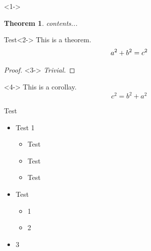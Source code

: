 \documentclass{beamer}
\newtheorem{thm}{Theorem}[theorem]
\begin{document}
	\begin{frame}<1->
		 \begin{thm}
	        contents...
	        \label{thm-1}
		 \end{thm}
		\begin{block}{Test}<2->
            This is a theorem.
            \begin{equation}
                a^2 + b^2 = c^2
            	\notag	
            	\label{equ-3}
            	\end{equation}
        \end{block}
    	
		\begin{proof}<3->
            \textit{Trivial.} 
        \end{proof}
		            
        \begin{corollary}<4->
            This is a corollay.
            \begin{equation}
                c^2 = b^2 + a^2
                \label{equ-4}
            \end{equation}
        \end{corollary}
	\end{frame}
	
	\begin{frame}{Test}
		\begin{itemize}
			\item Test 1
			\begin{itemize}
				\item Test
				\item Test
				\item Test 
			\end{itemize}
			\item Test
			\begin{itemize}
				\item 1
				\item 2
			\end{itemize}
		\item 3
		\end{itemize}
		
	\end{frame}

%		
%			
%				
\end{document}
